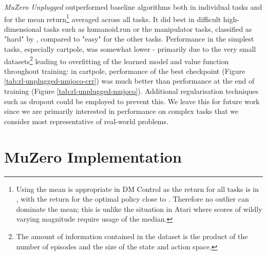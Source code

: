 \documentclass{article}
\newcommand{\mzunplugged}{\emph{MuZero Unplugged}}
\begin{document}
\mzunplugged{} outperformed baseline algorithms both in individual tasks and for the mean return\footnote{Using the mean is appropriate in DM Control as the return for all tasks is in , with the return for the optimal policy close to . Therefore no outlier can dominate the mean; this is unlike the situation in Atari where scores of wildly varying magnitude require usage of the median.} averaged across all tasks. It did best in difficult high-dimensional tasks such as humanoid.run or the manipulator tasks, classified as "hard" by \cite{wang2020critic}, compared to "easy" for the other tasks. Performance in the simplest tasks, especially cartpole, was somewhat lower - primarily due to the very small datasets\footnote{The amount of information contained in the dataset is the product of the number of episodes and the size of the state and action space.} leading to overfitting of the learned model and value function throughout training: in cartpole, performance of the best checkpoint (Figure \ref{tab:rl-unplugged-mujoco-crr}) was much better than performance at the end of training (Figure \ref{tab:rl-unplugged-mujoco}). Additional regularisation techniques such as dropout \cite{hinton2012dropout} could be employed to prevent this. We leave this for future work since we are primarily interested in performance on complex tasks that we consider most representative of real-world problems.

\section{MuZero Implementation}
\end{document}
